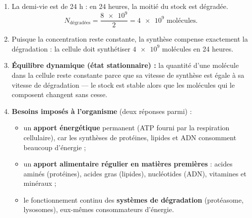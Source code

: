 \documentclass[11pt]{article}
\begin{document}
\begin{corrige}
\begin{enumerate}
\item La demi-vie est de 24 h : en 24 heures, la moitié du stock est dégradée.
\[ N_{\text{dégradées}} = \frac{\num{8e9}}{2} = \num{4e9} \text{ molécules}. \]

\item Puisque la concentration reste constante, la synthèse compense exactement la dégradation : la cellule doit synthétiser $\num{4e9}$ molécules en 24 heures.

\item \textbf{Équilibre dynamique (état stationnaire) :} la quantité d'une molécule dans la cellule reste constante parce que sa vitesse de synthèse est égale à sa vitesse de dégradation — le stock est stable alors que les molécules qui le composent changent sans cesse.

\item \textbf{Besoins imposés à l'organisme} (deux réponses parmi) :
\begin{itemize}
\item un \textbf{apport énergétique} permanent (ATP fourni par la respiration cellulaire), car les synthèses de protéines, lipides et ADN consomment beaucoup d'énergie ;
\item un \textbf{apport alimentaire régulier en matières premières} : acides aminés (protéines), acides gras (lipides), nucléotides (ADN), vitamines et minéraux ;
\item le fonctionnement continu des \textbf{systèmes de dégradation} (protéasome, lysosomes), eux-mêmes consommateurs d'énergie.
\end{itemize}
\end{enumerate}
\end{corrige}
\end{document}
